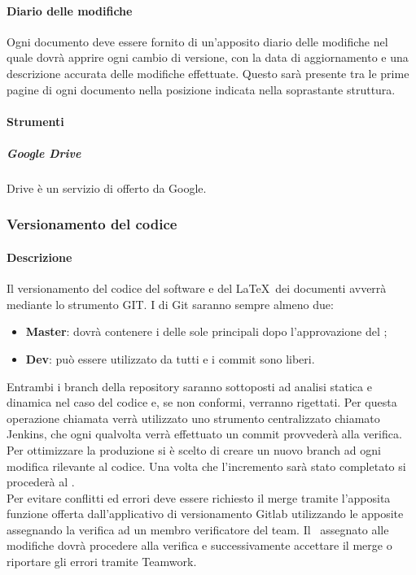 \documentclass[../NormeDiProgetto_v4.0.0.tex]{subfiles}
\begin{document}
				\paragraph{Diario delle modifiche}
				Ogni documento deve essere fornito di un'apposito diario delle modifiche nel quale dovrà apprire ogni cambio di versione, con la data di aggiornamento e una descrizione accurata delle modifiche effettuate. Questo sarà presente tra le prime pagine di ogni documento nella posizione indicata nella soprastante struttura.

				\paragraph{Strumenti}
					\subparagraph{Google Drive}
					Drive è un servizio di  offerto da Google.


			\subsubsection{Versionamento del codice}
				\paragraph{Descrizione}
				Il versionamento del codice del software e del \LaTeX\ dei documenti avverrà mediante lo strumento GIT.
				I  di Git saranno sempre almeno due:
				\begin{itemize}
					\item \textbf{Master}: dovrà contenere i  delle sole  principali dopo l'approvazione del \responsabilediprogetto;
					\item \textbf{Dev}: può essere utilizzato da tutti e i commit sono liberi.
				\end{itemize}
				Entrambi i branch della repository saranno sottoposti ad analisi statica e dinamica nel caso del codice e, se non conformi, verranno rigettati.
				Per questa operazione chiamata  verrà utilizzato uno strumento centralizzato chiamato Jenkins, che ogni qualvolta verrà effettuato un commit provvederà alla verifica.
				Per ottimizzare la produzione si è scelto di creare un nuovo branch ad ogni modifica rilevante al codice. Una volta che l'incremento sarà stato completato si procederà al . \\
				Per evitare conflitti ed errori deve essere richiesto il merge tramite l'apposita funzione offerta dall'applicativo di versionamento Gitlab utilizzando le apposite  assegnando la verifica ad un membro verificatore del team. Il \verificatore\ assegnato alle modifiche dovrà procedere alla verifica e successivamente accettare il merge o riportare gli errori tramite Teamwork.
			
\end{document}
